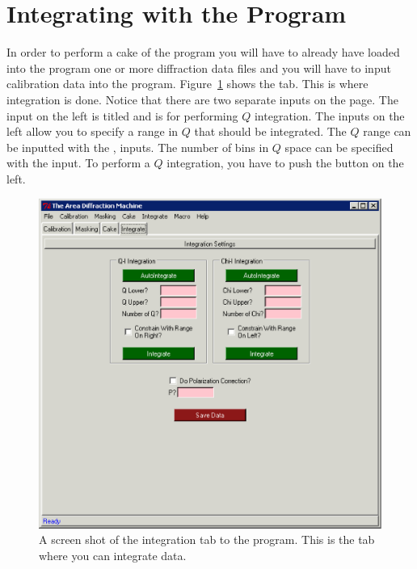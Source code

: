 \section{Integrating with the Program}


In order to perform a cake of the program you will have to 
already have loaded into the program one or more diffraction
data files and you will have to input calibration data
into the program. Figure~\ref{integration_page} shows the
 tab. This is where integration is done.
Notice that there are two separate inputs on the page. 
The input on the left is titled 
and is for performing $Q$ integration.
The inputs on the left allow you to specify a
range in $Q$ that should be integrated.
The $Q$ range can be inputted with the
,  inputs. The number of
bins in $Q$ space can be specified with the
 input. 
To perform a $Q$ integration, you have to push
the  button on the left.

\begin{figure}
    \centering
    \includegraphics[scale=.75]{figures/integration_page.eps}
    \caption{A screen shot of the integration tab 
    to the program. This is the tab where you can 
    integrate data.} 
    \label{integration_page}
\end{figure}

